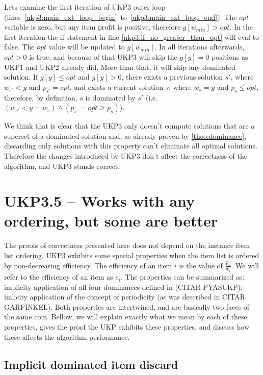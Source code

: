 \documentclass[12pt]{article}
\begin{document}
Lets examine the first iteration of UKP3 outer loop (lines~\ref{ukp3:main_ext_loop_begin}~to~\ref{ukp3:main_ext_loop_end}). The \(opt\) variable is zero, but any item profit is positive, therefore \(g[w_{min}] > opt\). In the first iteration the if statement in line \ref{ukp3:if_no_greater_than_opt} will eval to false. The \(opt\) value will be updated to \(g[w_{min}]\). In all iterations afterwards, \(opt > 0\) is true, and because of that UKP3 will skip the \(g[y] = 0\) positions as UKP1 and UKP2 already did. More than that, it will skip any dominated solution. If \(g[y] \leq opt\) and \(g[y] > 0\), there exists a previous solution \(s'\), where \(w_{s'} < y\) and \(p_{s'} = opt\), and exists a current solution \(s\), where \(w_s = y\) and \(p_s \leq opt\), therefore, by definition, \(s\) is dominated by \(s'\) (i.e. \((w_{s'} < y = w_s) \land (p_{s'} = opt \geq p_s)\)).

We think that is clear that the UKP3 only doesn't compute solutions that are a superset of a dominated solution and, as already proven by \autoref{theo:dominance}, discarding only solutions with this property can't eliminate all optimal solutions. Therefore the changes introduced by UKP3 don't affect the correctness of the algorithm, and UKP3 stands correct.

\section{UKP3.5 -- Works with any ordering, but some are better}

The proofs of correctness presented here does not depend on the instance item list ordering. UKP3 exhibits some special properties when the item list is ordered by non-decreasing efficiency. The efficiency of an item \(i\) is the value of \(\frac{p_i}{w_i}\). We will refer to the efficiency of an item as \(e_i\). The properties can be summarized as: implicity application of all four dominances defined in (CITAR PYASUKP); imlicity application of the concept of periodicity (as was described in CITAR GARFINKEL). Both properties are intertwined, and are basically two faces of the same coin. Bellow, we will explain exactly what we mean by each of these properties, gives the proof the UKP exhibits these properties, and discuss how these affects the algorithm performance.

\subsection{Implicit dominated item discard}
\end{document}
